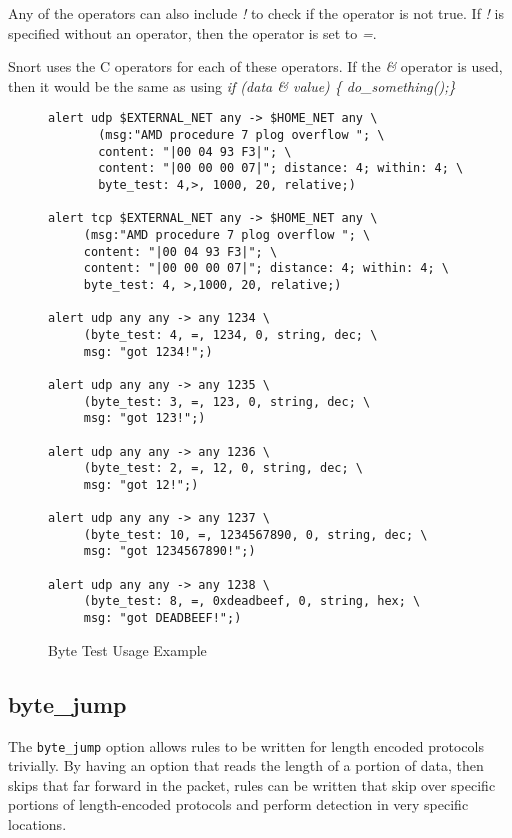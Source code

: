 \documentclass[english]{report}
\newenvironment{note}{
\samepage
    \vspace{10pt}{\textsf{
        {\hspace{7pt}\Huge{$\triangle$\hspace{-12.5pt}{\Large{$^!$}}}}\hspace{5pt}
        {\Large{NOTE}}
    }
    }
   \begin{center}
    \par\vspace{-17pt}

    \begin{lrbox}{\savepar}
    \begin{minipage}[r]{6in}
}
{
    \end{minipage}
    \end{lrbox}
    \fbox{
        \usebox{
            \savepar
	}
    }
    \par\vskip10pt
    \end{center}
}
\newenvironment{note}{
        \begin{rawhtml}
        <p><table border="1"><tr><td><b>
        Note:&nbsp;&nbsp;</b>
        \end{rawhtml}
}{
        \begin{rawhtml}
        </b></td></tr></table></p>
        \end{rawhtml}
}
\begin{document}
Any of the operators can also include \emph{!} to check if the operator is not true.  
If \emph{!} is specified without an operator, then the operator is set to \emph{=}.

\begin{note}
Snort uses the C operators for each of these operators.  If the \emph{\&} operator is used, 
then it would be the same as using \emph{if (data \& value) \{ do\_something();\} }
\end{note}

\begin{figure}[!hbpt]
\begin{verbatim}
alert udp $EXTERNAL_NET any -> $HOME_NET any \
       (msg:"AMD procedure 7 plog overflow "; \
       content: "|00 04 93 F3|"; \
       content: "|00 00 00 07|"; distance: 4; within: 4; \
       byte_test: 4,>, 1000, 20, relative;)

alert tcp $EXTERNAL_NET any -> $HOME_NET any \
     (msg:"AMD procedure 7 plog overflow "; \
     content: "|00 04 93 F3|"; \
     content: "|00 00 00 07|"; distance: 4; within: 4; \
     byte_test: 4, >,1000, 20, relative;)

alert udp any any -> any 1234 \
     (byte_test: 4, =, 1234, 0, string, dec; \
     msg: "got 1234!";)

alert udp any any -> any 1235 \
     (byte_test: 3, =, 123, 0, string, dec; \
     msg: "got 123!";)

alert udp any any -> any 1236 \
     (byte_test: 2, =, 12, 0, string, dec; \
     msg: "got 12!";)

alert udp any any -> any 1237 \
     (byte_test: 10, =, 1234567890, 0, string, dec; \
     msg: "got 1234567890!";)

alert udp any any -> any 1238 \
     (byte_test: 8, =, 0xdeadbeef, 0, string, hex; \
     msg: "got DEADBEEF!";)
\end{verbatim}
\caption{Byte Test Usage Example \label{fig:byte_test}}
\end{figure}

\subsection{byte\_jump\label{sub:byte_jump}}

The \texttt{byte\_jump} option allows rules to be written for length encoded protocols 
trivially. By having an option that reads the length of a portion of data,
then skips that far forward in the packet, rules can be written that skip
over specific portions of length-encoded protocols and perform detection in very specific locations.
\end{document}
